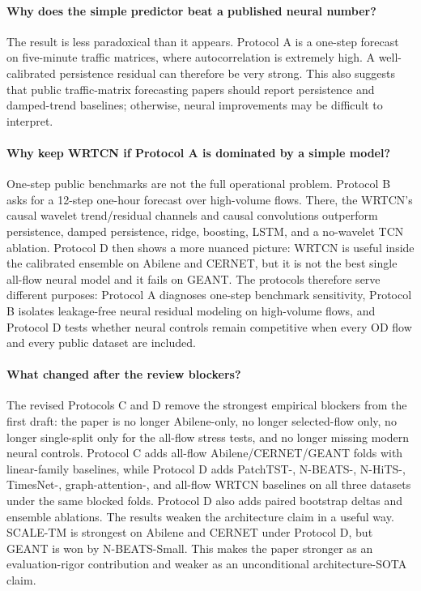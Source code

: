 \documentclass{article}
\begin{document}
\paragraph{Why does the simple predictor beat a published neural number?}
The result is less paradoxical than it appears. Protocol A is a one-step forecast on five-minute traffic matrices, where autocorrelation is extremely high. A well-calibrated persistence residual can therefore be very strong. This also suggests that public traffic-matrix forecasting papers should report persistence and damped-trend baselines; otherwise, neural improvements may be difficult to interpret.

\paragraph{Why keep WRTCN if Protocol A is dominated by a simple model?}
One-step public benchmarks are not the full operational problem. Protocol B asks for a 12-step one-hour forecast over high-volume flows. There, the WRTCN's causal wavelet trend/residual channels and causal convolutions outperform persistence, damped persistence, ridge, boosting, LSTM, and a no-wavelet TCN ablation. Protocol D then shows a more nuanced picture: WRTCN is useful inside the calibrated ensemble on Abilene and CERNET, but it is not the best single all-flow neural model and it fails on GEANT. The protocols therefore serve different purposes: Protocol A diagnoses one-step benchmark sensitivity, Protocol B isolates leakage-free neural residual modeling on high-volume flows, and Protocol D tests whether neural controls remain competitive when every OD flow and every public dataset are included.

\paragraph{What changed after the review blockers?}
The revised Protocols C and D remove the strongest empirical blockers from the first draft: the paper is no longer Abilene-only, no longer selected-flow only, no longer single-split only for the all-flow stress tests, and no longer missing modern neural controls. Protocol C adds all-flow Abilene/CERNET/GEANT folds with linear-family baselines, while Protocol D adds PatchTST-, N-BEATS-, N-HiTS-, TimesNet-, graph-attention-, and all-flow WRTCN baselines on all three datasets under the same blocked folds. Protocol D also adds paired bootstrap deltas and ensemble ablations. The results weaken the architecture claim in a useful way. SCALE-TM is strongest on Abilene and CERNET under Protocol D, but GEANT is won by N-BEATS-Small. This makes the paper stronger as an evaluation-rigor contribution and weaker as an unconditional architecture-SOTA claim.
\end{document}
